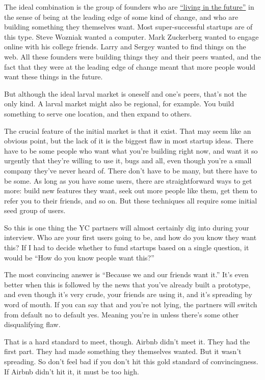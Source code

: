 \documentclass[12pt]{book}
\begin{document}
The ideal combination is the group of founders who are
\href{startupideas.html}{``living in the future''} in the sense of being
at the leading edge of some kind of change, and who are building
something they themselves want. Most super-successful startups are of
this type. Steve Wozniak wanted a computer. Mark Zuckerberg wanted to
engage online with his college friends. Larry and Sergey wanted to find
things on the web. All these founders were building things they and
their peers wanted, and the fact that they were at the leading edge of
change meant that more people would want these things in the future.

But although the ideal larval market is oneself and one's peers, that's
not the only kind. A larval market might also be regional, for example.
You build something to serve one location, and then expand to others.

The crucial feature of the initial market is that it exist. That may
seem like an obvious point, but the lack of it is the biggest flaw in
most startup ideas. There have to be some people who want what you're
building right now, and want it so urgently that they're willing to use
it, bugs and all, even though you're a small company they've never heard
of. There don't have to be many, but there have to be some. As long as
you have some users, there are straightforward ways to get more: build
new features they want, seek out more people like them, get them to
refer you to their friends, and so on. But these techniques all require
some initial seed group of users.

So this is one thing the YC partners will almost certainly dig into
during your interview. Who are your first users going to be, and how do
you know they want this? If I had to decide whether to fund startups
based on a single question, it would be ``How do you know people want
this?''

The most convincing answer is ``Because we and our friends want it.''
It's even better when this is followed by the news that you've already
built a prototype, and even though it's very crude, your friends are
using it, and it's spreading by word of mouth. If you can say that and
you're not lying, the partners will switch from default no to default
yes. Meaning you're in unless there's some other disqualifying flaw.

That is a hard standard to meet, though. Airbnb didn't meet it. They had
the first part. They had made something they themselves wanted. But it
wasn't spreading. So don't feel bad if you don't hit this gold standard
of convincingness. If Airbnb didn't hit it, it must be too high.
\end{document}
